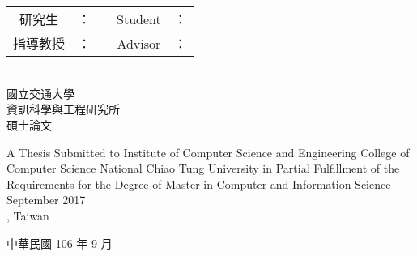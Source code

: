 \begin{titlepage}
  \begin{center}
    \LARGE \chineseTitle{}  \\
    \LARGE \englishTitle{}  \\[1.5cm]
  
    \Large
    \begin{tabular}{c l c c l}
    研究生 & ：\studentChName{} & \hspace{3cm}  & Student  & ：\studentEnName{} \\
    指導教授 & ：\advisorChName{} & \hspace{3cm}  & Advisor  & ：\advisorEnName{}\\
    \end{tabular}
    \\[1.5cm]
    國立交通大學 \\
    資訊科學與工程研究所 \\
    碩士論文 \\[1cm]
	
    \begin{singlespace}
    A Thesis Submitted to Institute of Computer Science and Engineering College of Computer Science National Chiao Tung University in Partial Fulfillment of the Requirements for the Degree of Master in Computer and Information Science \\
    September 2017 \\
    \studentEnName{}, Taiwan \\
    \end{singlespace}

  \end{center}

  \vspace{\fill}

  \begin{center}
    {\LARGE 中華民國  106 年 9 月}
  \end{center}
\end{titlepage}